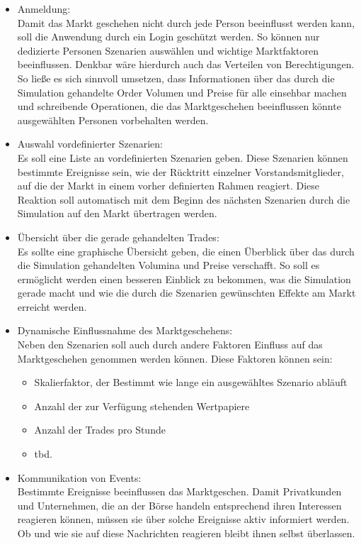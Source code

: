 	\begin{itemize}
		\item Anmeldung: \\
			Damit das Markt geschehen nicht durch jede Person beeinflusst werden kann, soll die Anwendung durch ein Login geschützt werden. So können nur dedizierte Personen Szenarien auswählen und wichtige Marktfaktoren beeinflussen. Denkbar wäre hierdurch auch das Verteilen von Berechtigungen. So ließe es sich sinnvoll umsetzen, dass Informationen über das durch die Simulation gehandelte Order Volumen und Preise für alle einsehbar machen und schreibende Operationen, die das Marktgeschehen beeinflussen könnte ausgewählten Personen vorbehalten werden.
		
		\item Auswahl vordefinierter Szenarien: \\
			Es soll eine Liste an vordefinierten Szenarien geben. Diese Szenarien können bestimmte Ereignisse sein, wie der Rücktritt einzelner Vorstandsmitglieder, auf die der Markt in einem vorher definierten Rahmen reagiert. Diese Reaktion soll automatisch mit dem Beginn des nächsten Szenarien durch die Simulation auf den Markt übertragen werden.
			
		\item Übersicht über die gerade gehandelten Trades: \\
			Es sollte eine graphische Übersicht geben, die einen Überblick über das durch die Simulation gehandelten Volumina und Preise verschafft. So soll es ermöglicht werden einen besseren Einblick zu bekommen, was die Simulation gerade macht und wie die durch die Szenarien gewünschten Effekte am Markt erreicht werden.
			
		\item Dynamische Einflussnahme des Marktgeschehens: \\
			Neben den Szenarien soll auch durch andere Faktoren Einfluss auf das Marktgeschehen genommen werden können. Diese Faktoren können sein:
				\begin{itemize}
					\item Skalierfaktor, der Bestimmt wie lange ein ausgewähltes Szenario abläuft
					\item Anzahl der zur Verfügung stehenden Wertpapiere
					\item Anzahl der Trades pro Stunde
					\item tbd.
				\end{itemize}
			
		\item Kommunikation von Events: \\
			Bestimmte Ereignisse beeinflussen das Marktgeschen. Damit Privatkunden und Unternehmen, die an der Börse handeln entsprechend ihren Interessen reagieren können, müssen sie über solche Ereignisse aktiv informiert werden. Ob und wie sie auf diese Nachrichten reagieren bleibt ihnen selbst überlassen.
			

\end{itemize}
